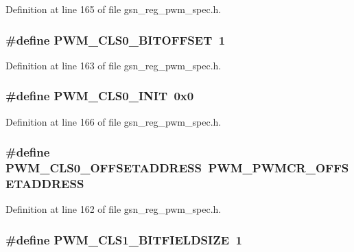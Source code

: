 Definition at line 165 of file gsn\_\-reg\_\-pwm\_\-spec.h.

\hypertarget{a00565_a794c36116a3f31f40f7cdae0b58b6a3c}{
\subsubsection[{PWM\_\-CLS0\_\-BITOFFSET}]{\setlength{\rightskip}{0pt plus 5cm}\#define PWM\_\-CLS0\_\-BITOFFSET~1}}
\label{a00565_a794c36116a3f31f40f7cdae0b58b6a3c}


Definition at line 163 of file gsn\_\-reg\_\-pwm\_\-spec.h.

\hypertarget{a00565_a5976b8924a69c971d37e8b23bdca325f}{
\subsubsection[{PWM\_\-CLS0\_\-INIT}]{\setlength{\rightskip}{0pt plus 5cm}\#define PWM\_\-CLS0\_\-INIT~0x0}}
\label{a00565_a5976b8924a69c971d37e8b23bdca325f}


Definition at line 166 of file gsn\_\-reg\_\-pwm\_\-spec.h.

\hypertarget{a00565_a0c550f5d2d70f5e6d68ab9a0ea7cc3c2}{
\subsubsection[{PWM\_\-CLS0\_\-OFFSETADDRESS}]{\setlength{\rightskip}{0pt plus 5cm}\#define PWM\_\-CLS0\_\-OFFSETADDRESS~PWM\_\-PWMCR\_\-OFFSETADDRESS}}
\label{a00565_a0c550f5d2d70f5e6d68ab9a0ea7cc3c2}


Definition at line 162 of file gsn\_\-reg\_\-pwm\_\-spec.h.

\hypertarget{a00565_a914ddc7576bf9a85724a228403093c49}{
\subsubsection[{PWM\_\-CLS1\_\-BITFIELDSIZE}]{\setlength{\rightskip}{0pt plus 5cm}\#define PWM\_\-CLS1\_\-BITFIELDSIZE~1}}
\label{a00565_a914ddc7576bf9a85724a228403093c49}


